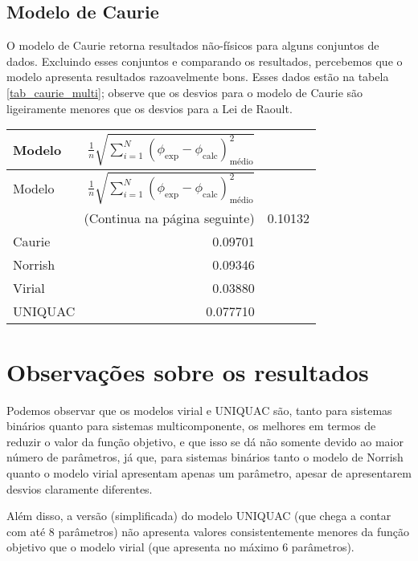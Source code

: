 \documentclass[
	12pt,				%
	openright,
	twoside,
	a4paper,			%
	english,			%
	french,				%
	spanish,			%
	brazil				%
	]{abntex2}
\begin{document}
\subsection{Modelo de Caurie}

O modelo de Caurie retorna resultados não-físicos para alguns conjuntos de dados.
Excluindo esses conjuntos e comparando os resultados, percebemos que o modelo
apresenta resultados razoavelmente bons. Esses dados estão na tabela
\ref{tab_caurie_multi}; observe que os desvios para o modelo de Caurie são
ligeiramente menores que os desvios para a Lei de Raoult.

\begin{tabularx}{\textwidth}{ X  r }
	\caption{Comparação com o modelo de Caurie}
	\label{tab_caurie_multi}\\
	\toprule
	Modelo & %
		$\frac{1}{n}\sqrt{\sum_{i=1}^N(\phi_{\text{exp}}-%
		\phi_{\text{calc}})^2_\text{médio}}$\\
	\midrule
	\endfirsthead
	\toprule
	Modelo & %
		$\frac{1}{n}\sqrt{\sum_{i=1}^N(\phi_{\text{exp}}-%
		\phi_{\text{calc}})^2_\text{médio}}$\\\hline
	\midrule
	\endhead
	\midrule
	\multicolumn{2}{r}{\footnotesize(Continua na página seguinte)}
	\endfoot
	\endlastfoot
	Raoult & 0.10132 \\
	Caurie & 0.09701 \\
	Norrish & 0.09346 \\
	Virial & 0.03880 \\
	UNIQUAC & 0.077710 \\\hline
\end{tabularx}

\section{Observações sobre os resultados}

Podemos observar que os modelos virial e UNIQUAC são, tanto para sistemas
binários quanto para sistemas multicomponente, os melhores em termos de
reduzir o valor da função objetivo, e que isso se dá não somente devido ao maior
número de parâmetros, já que, para sistemas binários tanto o modelo de Norrish
quanto o modelo virial apresentam apenas um parâmetro, apesar de apresentarem desvios
claramente diferentes.

Além disso, a versão (simplificada) do modelo UNIQUAC (que chega a contar com até 8
parâmetros) não apresenta valores consistentemente menores da função objetivo que o
modelo virial (que apresenta no máximo 6 parâmetros).
\end{document}
